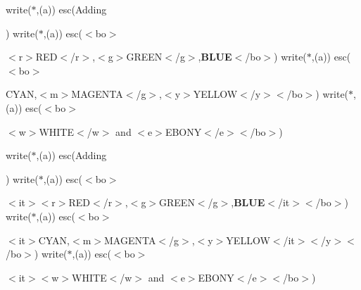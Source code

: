 write($\ast$,\textquotesingle{}(a)\textquotesingle{}) esc(\textquotesingle{}Adding 
\begin{DoxyItemize}
\item 
\end{DoxyItemize}\textquotesingle{}) write($\ast$,\textquotesingle{}(a)\textquotesingle{}) esc(\textquotesingle{}$<$bo$>$
\begin{DoxyItemize}
\item 
\end{DoxyItemize}$<$r$>$R\+ED$<$/r$>$,$<$g$>$G\+R\+E\+EN$<$/g$>$,{\bfseries B\+L\+UE}$<$/bo$>$\textquotesingle{}) write($\ast$,\textquotesingle{}(a)\textquotesingle{}) esc(\textquotesingle{}$<$bo$>$
\begin{DoxyItemize}
\item 
\end{DoxyItemize}{\ttfamily C\+Y\+AN},$<$m$>$M\+A\+G\+E\+N\+TA$<$/g$>$,$<$y$>$Y\+E\+L\+L\+OW$<$/y$>$$<$/bo$>$\textquotesingle{}) write($\ast$,\textquotesingle{}(a)\textquotesingle{}) esc(\textquotesingle{}$<$bo$>$
\begin{DoxyItemize}
\item 
\end{DoxyItemize}$<$w$>$W\+H\+I\+TE$<$/w$>$ and $<$e$>$E\+B\+O\+NY$<$/e$>$$<$/bo$>$\textquotesingle{})

write($\ast$,\textquotesingle{}(a)\textquotesingle{}) esc(\textquotesingle{}Adding 
\begin{DoxyItemize}
\item 
\end{DoxyItemize}\textquotesingle{}) write($\ast$,\textquotesingle{}(a)\textquotesingle{}) esc(\textquotesingle{}$<$bo$>$
\begin{DoxyItemize}
\item 
\end{DoxyItemize}$<$it$>$$<$r$>$R\+ED$<$/r$>$,$<$g$>$G\+R\+E\+EN$<$/g$>$,{\bfseries B\+L\+UE}$<$/it$>$$<$/bo$>$\textquotesingle{}) write($\ast$,\textquotesingle{}(a)\textquotesingle{}) esc(\textquotesingle{}$<$bo$>$
\begin{DoxyItemize}
\item 
\end{DoxyItemize}$<$it$>${\ttfamily C\+Y\+AN},$<$m$>$M\+A\+G\+E\+N\+TA$<$/g$>$,$<$y$>$Y\+E\+L\+L\+OW$<$/it$>$$<$/y$>$$<$/bo$>$\textquotesingle{}) write($\ast$,\textquotesingle{}(a)\textquotesingle{}) esc(\textquotesingle{}$<$bo$>$
\begin{DoxyItemize}
\item 
\end{DoxyItemize}$<$it$>$$<$w$>$W\+H\+I\+TE$<$/w$>$ and $<$e$>$E\+B\+O\+NY$<$/e$>$$<$/bo$>$\textquotesingle{})


